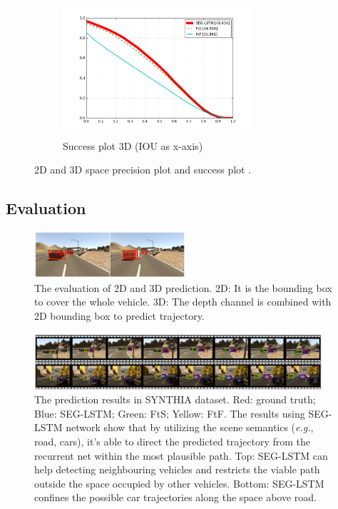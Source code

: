 \documentclass[10pt,twocolumn,letterpaper]{article}
\begin{document}
\begin{figure}[t]
\begin{subfigure}[c]{0.4\textwidth}
    \centering
        \includegraphics[width=7cm,height=5cm, clip]{figures/success_plot_3d.png}
        \caption{\small{Success plot 3D (IOU as x-axis)}}
    \end{subfigure}
\caption{2D and 3D space precision plot and success plot .
}
\label{fig:precision_plot_and_success_plot}
\end{figure}

\subsection{Evaluation}
\begin{figure}[t]
        \centering
        \includegraphics[width=0.5\textwidth]{figures/evaluation.pdf}
        \caption{ The evaluation of 2D and 3D prediction. 2D: It is the bounding box to cover the whole vehicle. 3D: The depth channel is combined with 2D bounding box to predict trajectory.
        }
        \label{fig:evaluation}
\end{figure}

\begin{figure}[t]
        \centering
        \includegraphics[width=0.95\textwidth]{figures/prediction.pdf}
        \caption{
        The prediction results in SYNTHIA dataset. {\color{red}Red: ground truth}; {\color{blue}Blue: SEG-LSTM}; {\color{green}Green: FtS}; {\color{yellow}Yellow: FtF}.
                The results using SEG-LSTM network show that by utilizing the scene semantics (\emph{e.g.}, road, cars), it's able to direct the predicted trajectory from the recurrent net within the most plausible path. Top: SEG-LSTM can help detecting neighbouring vehicles and restricts the viable path outside the space occupied by other vehicles. Bottom:  SEG-LSTM confines the possible car trajectories along the space above road.
                }
        \label{fig:final}
\end{figure}
\end{document}
